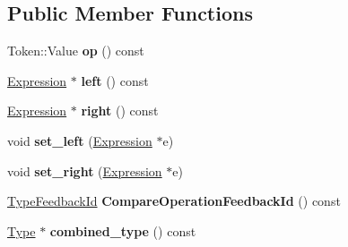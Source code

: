 \subsection*{Public Member Functions}
\begin{DoxyCompactItemize}
\item 
Token\+::\+Value {\bfseries op} () const \hypertarget{classv8_1_1internal_1_1_compare_operation_a91b3c54dfb98b208543f837651a79948}{}\label{classv8_1_1internal_1_1_compare_operation_a91b3c54dfb98b208543f837651a79948}

\item 
\hyperlink{classv8_1_1internal_1_1_expression}{Expression} $\ast$ {\bfseries left} () const \hypertarget{classv8_1_1internal_1_1_compare_operation_ad76a5512d29ed7bd4262cdb6e92c2d6b}{}\label{classv8_1_1internal_1_1_compare_operation_ad76a5512d29ed7bd4262cdb6e92c2d6b}

\item 
\hyperlink{classv8_1_1internal_1_1_expression}{Expression} $\ast$ {\bfseries right} () const \hypertarget{classv8_1_1internal_1_1_compare_operation_adbf9e858fb23505aafe7172cf320e48a}{}\label{classv8_1_1internal_1_1_compare_operation_adbf9e858fb23505aafe7172cf320e48a}

\item 
void {\bfseries set\+\_\+left} (\hyperlink{classv8_1_1internal_1_1_expression}{Expression} $\ast$e)\hypertarget{classv8_1_1internal_1_1_compare_operation_aeaf4cc21372fd9b6877c59360012a897}{}\label{classv8_1_1internal_1_1_compare_operation_aeaf4cc21372fd9b6877c59360012a897}

\item 
void {\bfseries set\+\_\+right} (\hyperlink{classv8_1_1internal_1_1_expression}{Expression} $\ast$e)\hypertarget{classv8_1_1internal_1_1_compare_operation_a2a8644cc32669b64b8dd95ceef6d3b15}{}\label{classv8_1_1internal_1_1_compare_operation_a2a8644cc32669b64b8dd95ceef6d3b15}

\item 
\hyperlink{classv8_1_1internal_1_1_type_feedback_id}{Type\+Feedback\+Id} {\bfseries Compare\+Operation\+Feedback\+Id} () const \hypertarget{classv8_1_1internal_1_1_compare_operation_aa2e05dbd9417431228df70e28675ca97}{}\label{classv8_1_1internal_1_1_compare_operation_aa2e05dbd9417431228df70e28675ca97}

\item 
\hyperlink{classv8_1_1internal_1_1_type}{Type} $\ast$ {\bfseries combined\+\_\+type} () const \hypertarget{classv8_1_1internal_1_1_compare_operation_a70bdc8613d8083bd5055a6064feb5ebd}{}\label{classv8_1_1internal_1_1_compare_operation_a70bdc8613d8083bd5055a6064feb5ebd}


\end{DoxyCompactItemize}

